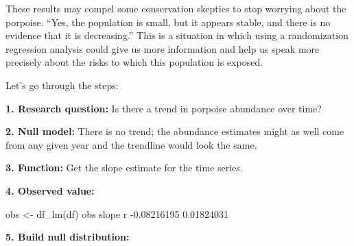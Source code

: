 \documentclass[
]{book}
\newenvironment{Shaded}{\begin{snugshade}}{\end{snugshade}}
\newcommand{\ControlFlowTok}[1]{\textcolor[rgb]{0.13,0.29,0.53}{\textbf{#1}}}
\newcommand{\DecValTok}[1]{\textcolor[rgb]{0.00,0.00,0.81}{#1}}
\newcommand{\FloatTok}[1]{\textcolor[rgb]{0.00,0.00,0.81}{#1}}
\newcommand{\FunctionTok}[1]{\textcolor[rgb]{0.00,0.00,0.00}{#1}}
\newcommand{\NormalTok}[1]{#1}
\newcommand{\OtherTok}[1]{\textcolor[rgb]{0.56,0.35,0.01}{#1}}
\newcommand{\SpecialCharTok}[1]{\textcolor[rgb]{0.00,0.00,0.00}{#1}}
\newcommand{\StringTok}[1]{\textcolor[rgb]{0.31,0.60,0.02}{#1}}
\begin{document}
These results may compel some conservation skeptics to stop worrying about the porpoise. ``Yes, the population is small, but it appears stable, and there is no evidence that it is decreasing.'' This is a situation in which using a randomization regression analysis could give us more information and help us speak more precisely about the risks to which this population is exposed.

Let's go through the steps:

\textbf{1. Research question:} Is there a trend in porpoise abundance over time?

\textbf{2. Null model:} There is no trend; the abundance estimates might as well come from any given year and the trendline would look the same.

\textbf{3. Function:} Get the slope estimate for the time series.

\begin{Shaded}
\end{Shaded}

\textbf{4. Observed value:}

\begin{Shaded}
\begin{Highlighting}[]
\NormalTok{obs }\OtherTok{\textless{}{-}} \FunctionTok{df\_lm}\NormalTok{(df)}
\NormalTok{obs }
\NormalTok{      slope           r }
\SpecialCharTok{{-}}\FloatTok{0.08216195}  \FloatTok{0.01824031} 
\end{Highlighting}
\end{Shaded}

\textbf{5. Build null distribution:}
\end{document}
